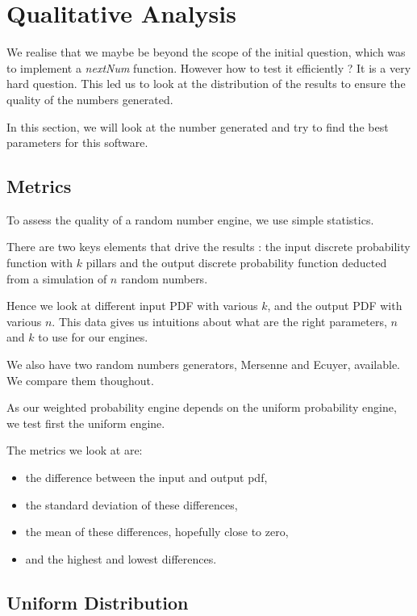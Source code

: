 \documentclass[12pt,a4paper,article]{memoir} %
\begin{document}
\section{Qualitative Analysis}
\label{sec:quality}
We realise that we maybe be beyond the scope of the initial
question, which was to implement a \emph{nextNum} function.
However how to test it efficiently ? It is a very hard question.
This led us to look at the distribution of the results to ensure
the quality of the numbers generated.

In this section, we will look at the number generated and try
to find the best parameters for this software.

\subsection{Metrics}
To assess the quality of a random number engine, we use
simple statistics. 

There are two keys elements that drive the results :
the input discrete probability function with $k$ pillars and
the output discrete probability function deducted from a
simulation of $n$ random numbers.

Hence we look at different input PDF with various $k$,
and the output PDF with various $n$. 
This data gives us intuitions about what are the right
parameters, $n$ and $k$ to use for our engines.

We also have two random numbers generators, 
Mersenne and Ecuyer, available. We compare them thoughout.

As our weighted probability engine depends on
the uniform probability engine, we test first the uniform engine.

The metrics we look at are:
\begin{itemize}
	\item the difference between the input and output pdf,
	\item the standard deviation of these differences,
	\item the mean of these differences, hopefully close to zero,
	\item and the highest and lowest differences.
\end{itemize}

\subsection{Uniform Distribution}
\end{document}
